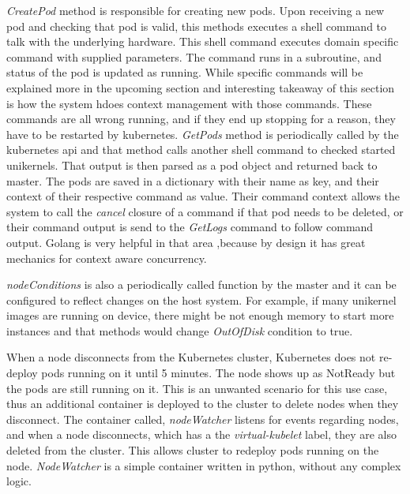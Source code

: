 \textit{CreatePod} method is responsible for creating new pods. Upon receiving a new pod and checking that pod is valid, this methods executes a shell command to talk with the underlying hardware. This shell command executes domain specific command with supplied parameters. The command runs in a subroutine, and status of the pod is updated as running. While specific commands will be explained more in the upcoming section and interesting takeaway of this section is how the system hdoes context management with those commands. These commands are all wrong running, and if they end up stopping for a reason, they have to be restarted by kubernetes. \textit{GetPods} method is periodically called by the kubernetes api and that method calls another shell command to checked started unikernels. That output is then parsed as a pod object and returned back to master. The pods are saved in a dictionary with their name as key, and their context of their respective command as value. Their command context allows the system to call the \textit{cancel} closure of a command if that pod needs to be deleted, or their command output is send to the \textit{GetLogs} command to follow command output. Golang is very helpful in that area ,because by design it has great mechanics for context aware concurrency.

\textit{nodeConditions} is also a periodically called function by the master and it can be configured to reflect changes on the host system. For example, if many unikernel images are running on device, there might be not enough memory to start more instances and that methods would change \textit{OutOfDisk} condition to true.

When a node disconnects from the Kubernetes cluster, Kubernetes does not re-deploy pods running on it until 5 minutes. The node shows up as NotReady but the pods are still running on it. This is an unwanted scenario for this use case, thus an additional container is deployed to the cluster to delete nodes when they disconnect. The container called, \textit{nodeWatcher} listens for events regarding nodes, and when a node disconnects, which has a the \textit{virtual-kubelet} label, they are also deleted from the cluster. This allows cluster to redeploy pods running on the node. \textit{NodeWatcher} is a simple container written in python, without any complex logic.